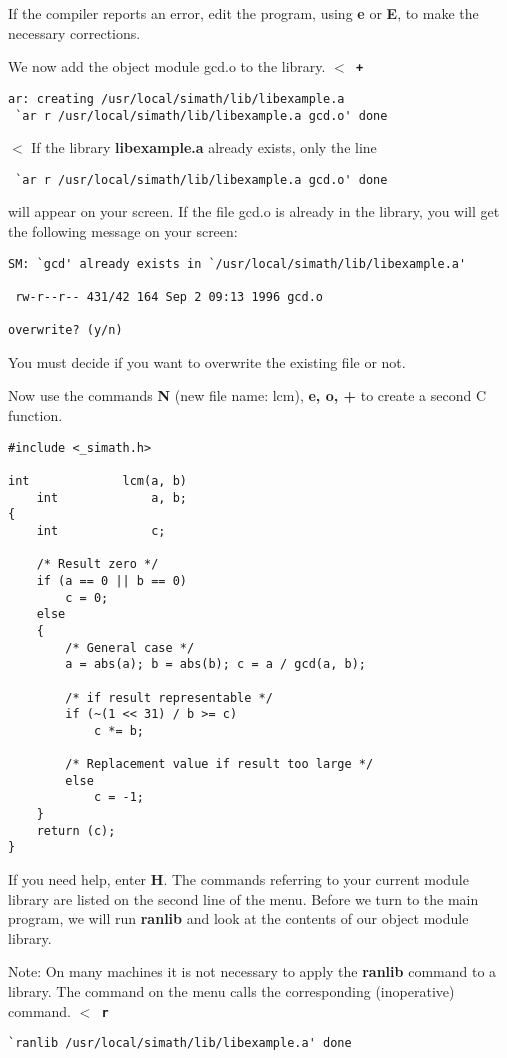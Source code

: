 If the compiler reports an error, edit the program, using {\bf e} or {\bf E},
to make the necessary corrections.

We now add the object module gcd.o to the library.
\leer
{\tt $<$ {\bf +}\index{+} \care}
\begin{verbatim}
ar: creating /usr/local/simath/lib/libexample.a
 `ar r /usr/local/simath/lib/libexample.a gcd.o' done
\end{verbatim}
$<$
\leer
If the library {\bf libexample.a} already exists, only the line
\begin{verbatim}
 `ar r /usr/local/simath/lib/libexample.a gcd.o' done
\end{verbatim}
will appear on your screen. If the file gcd.o is already in
the library, you will get the following message on your screen:
\begin{verbatim}
SM: `gcd' already exists in `/usr/local/simath/lib/libexample.a'

 rw-r--r-- 431/42 164 Sep 2 09:13 1996 gcd.o

overwrite? (y/n)
\end{verbatim}
You must decide if you want to overwrite the existing file or not.

\newpage

Now use the commands {\bf N} (new file name: lcm), 
{\bf e, o, +} to create a second C function.

\begin{verbatim}
#include <_simath.h>

int             lcm(a, b)
    int             a, b;
{
    int             c;

    /* Result zero */
    if (a == 0 || b == 0)
        c = 0;
    else
    {
        /* General case */
        a = abs(a); b = abs(b); c = a / gcd(a, b);

        /* if result representable */
        if (~(1 << 31) / b >= c)
            c *= b;

        /* Replacement value if result too large */
        else
            c = -1;
    }
    return (c);
}
\end{verbatim}
If you need help, enter {\bf H}. The commands referring to your current module
library are listed on the second line of the menu. Before we turn to the main program,
we will run {\bf ranlib} and look at the contents of our object module library.

\label{NOTEranlib}
Note: On many machines it is not necessary to apply the {\bf ranlib} command to a library.
The command on the menu calls the corresponding (inoperative) command.
\leer
{\tt $<$ {\bf r} \care}
\begin{verbatim}
`ranlib /usr/local/simath/lib/libexample.a' done
\end{verbatim}

